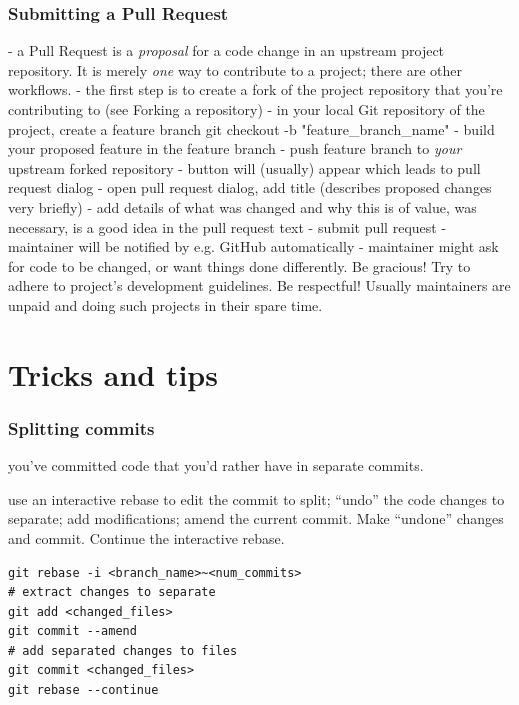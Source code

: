 \documentclass{git_course}
\begin{document}
\begin{frame}
    \frametitle{Submitting a Pull Request}
    - a Pull Request is a \emph{proposal} for a code change in an upstream
    project repository.  It is merely \emph{one} way to contribute to a
    project; there are other workflows.
    - the first step is to create a fork of the project repository that
    you're contributing to (see Forking a repository)
    - in your local Git repository of the project, create a feature branch
    git checkout -b "feature_branch_name"
    - build your proposed feature in the feature branch
    - push feature branch to \emph{your} upstream forked repository
    - button will (usually) appear which leads to pull request dialog
    - open pull request dialog, add title (describes proposed changes very
    briefly)
    - add details of what was changed and why this is of value, was
    necessary, is a good idea in the pull request text
    - submit pull request
    - maintainer will be notified by e.g. GitHub automatically
    - maintainer might ask for code to be changed, or want things done
    differently. Be gracious! Try to adhere to project's development
    guidelines. Be respectful! Usually maintainers are unpaid and doing such
    projects in their spare time.
\end{frame}


\section{Tricks and tips}

\begin{frame}[fragile]
    \frametitle{Splitting commits}
     you've committed code that you'd rather have in
        separate commits.

     use an interactive rebase to edit the commit
        to split; ``undo'' the code changes to separate; add
        modifications; amend the current commit.
        Make ``undone'' changes and commit.  Continue
        the interactive rebase.
\begin{lstlisting}
git rebase -i <branch_name>~<num_commits>
# extract changes to separate
git add <changed_files>
git commit --amend
# add separated changes to files
git commit <changed_files>
git rebase --continue
\end{lstlisting}

\end{frame}
\end{document}
